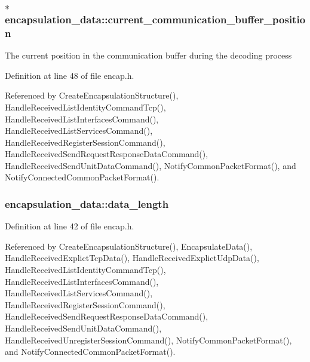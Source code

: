 \hypertarget{structencapsulation__data_aea1f797ee9ab44d96af2ed76c65c7e5b}{
\subsubsection[{current\-\_\-communication\-\_\-buffer\-\_\-position}]{$\ast$ {\bf encapsulation\-\_\-data\-::current\-\_\-communication\-\_\-buffer\-\_\-position}}}\label{d9/d42/structencapsulation__data_aea1f797ee9ab44d96af2ed76c65c7e5b}
\-The current position in the communication buffer during the decoding process 

\-Definition at line 48 of file encap.\-h.



\-Referenced by \-Create\-Encapsulation\-Structure(), \-Handle\-Received\-List\-Identity\-Command\-Tcp(), \-Handle\-Received\-List\-Interfaces\-Command(), \-Handle\-Received\-List\-Services\-Command(), \-Handle\-Received\-Register\-Session\-Command(), \-Handle\-Received\-Send\-Request\-Response\-Data\-Command(), \-Handle\-Received\-Send\-Unit\-Data\-Command(), \-Notify\-Common\-Packet\-Format(), and \-Notify\-Connected\-Common\-Packet\-Format().

\hypertarget{structencapsulation__data_a35e50f3e90d29bec932121aa92e08f63}{
\subsubsection[{data\-\_\-length}]{ {\bf encapsulation\-\_\-data\-::data\-\_\-length}}}\label{d9/d42/structencapsulation__data_a35e50f3e90d29bec932121aa92e08f63}


\-Definition at line 42 of file encap.\-h.



\-Referenced by \-Create\-Encapsulation\-Structure(), \-Encapsulate\-Data(), \-Handle\-Received\-Explict\-Tcp\-Data(), \-Handle\-Received\-Explict\-Udp\-Data(), \-Handle\-Received\-List\-Identity\-Command\-Tcp(), \-Handle\-Received\-List\-Interfaces\-Command(), \-Handle\-Received\-List\-Services\-Command(), \-Handle\-Received\-Register\-Session\-Command(), \-Handle\-Received\-Send\-Request\-Response\-Data\-Command(), \-Handle\-Received\-Send\-Unit\-Data\-Command(), \-Handle\-Received\-Unregister\-Session\-Command(), \-Notify\-Common\-Packet\-Format(), and \-Notify\-Connected\-Common\-Packet\-Format().

